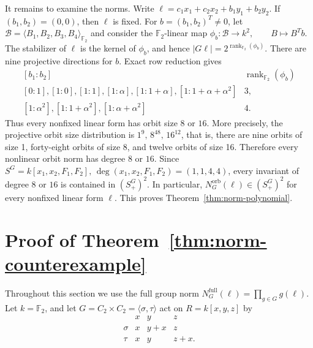 \documentclass[11pt]{article}
\theoremstyle{definition}
\begin{document}
It remains to examine the norms.  Write $\ell=c_1x_1+c_2x_2+b_1y_1+b_2y_2$. If $(b_1,b_2)=(0,0)$, then $\ell$ is fixed.  For $b=(b_1,b_2)^T\neq0$, let $\mathcal B=\langle B_1,B_2,B_3,B_4\rangle_{\mathbb F_2}$ and consider the $\mathbb F_2$-linear map $\phi_b:\mathcal B\longrightarrow k^2,\qquad B\longmapsto B^Tb$. The stabilizer of $\ell$ is the kernel of $\phi_b$, and hence $|G\ell|=2^{\operatorname{rank}_{\mathbb F_2}(\phi_b)}$. There are nine projective directions for $b$.  Exact row reduction
gives
\[
\begin{array}{c|c}
	[b_1:b_2]&\operatorname{rank}_{\mathbb F_2}(\phi_b)\\ \hline
	[0:1], [1:0], [1:1], [1:\alpha], [1:1+\alpha],
	[1:1+\alpha+\alpha^2]&3,\\
	{}[1:\alpha^2], [1:1+\alpha^2], [1:\alpha+\alpha^2]&4.
\end{array}
\]
Thus every nonfixed linear form has orbit size $8$ or $16$.  More
precisely, the projective orbit size distribution is $1^9,\, 8^{48},\, 16^{12}$, that is, there are nine orbits of size 1, forty-eight orbits of size 8, and twelve orbits of size 16. Therefore every nonlinear orbit norm has degree $8$ or $16$.  Since $S^G=k[x_1,x_2,F_1,F_2],\, \deg(x_1,x_2,F_1,F_2)=(1,1,4,4)$,
every invariant of degree $8$ or $16$ is contained in $(S^G_+)^2$.
In particular, $N_G^{\mathrm{orb}}(\ell)\in(S^G_+)^2$ for every nonfixed linear form $\ell$. This proves Theorem~\ref{thm:norm-polynomial}.


\section{Proof of Theorem~\ref{thm:norm-counterexample}}
\label{sec:norm-counterexample}

Throughout this section we use the full group norm $N_G^{\mathrm{full}}(\ell)=\prod_{g\in G}g(\ell)$. Let $k=\mathbb F_2$, and let $G=C_2\times C_2=\langle\sigma,\tau\rangle$
act on $R=k[x,y,z]$ by
\[
\begin{array}{c|ccc}
	&x&y&z\\ \hline
	\sigma&x&y+x&z\\
	\tau&x&y&z+x.
\end{array}
\]
\end{document}
